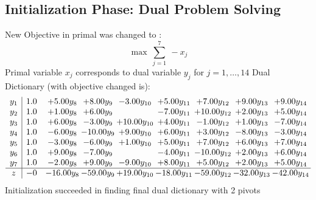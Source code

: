 \documentclass[8pt]{article}
\begin{document}
\subsection{Initialization Phase: Dual Problem Solving}
New Objective in primal was changed to : \[ \max\ \sum_{j=1}^{7}\ - x_j \] 
Primal variable $x_j$ corresponds to dual variable $y_j$ for $j = 1,\ldots,14$
Dual Dictionary (with objective changed is): 
\[\begin{array}{c| c c@{\hskip 2pt} c@{\hskip 2pt} c@{\hskip 2pt} c@{\hskip 2pt} c@{\hskip 2pt} c@{\hskip 2pt} c@{\hskip 2pt} }
 y_{1}   &  1.0 & +  5.00 y_{8} & +  8.00 y_{9} & -3.00 y_{10} & +  5.00 y_{11} & +  7.00 y_{12} & +  9.00 y_{13} & +  9.00 y_{14}\\
 y_{2}   &  1.0 & +  1.00 y_{8} & +  6.00 y_{9} &   & -7.00 y_{11} & + 10.00 y_{12} & +  2.00 y_{13} & +  5.00 y_{14}\\
 y_{3}   &  1.0 & +  6.00 y_{8} & -3.00 y_{9} & + 10.00 y_{10} & +  4.00 y_{11} & -1.00 y_{12} & +  1.00 y_{13} & -7.00 y_{14}\\
 y_{4}   &  1.0 & -6.00 y_{8} & -10.00 y_{9} & +  9.00 y_{10} & +  6.00 y_{11} & +  3.00 y_{12} & -8.00 y_{13} & -3.00 y_{14}\\
 y_{5}   &  1.0 & -3.00 y_{8} & -6.00 y_{9} & +  1.00 y_{10} & +  5.00 y_{11} & +  7.00 y_{12} & +  6.00 y_{13} & +  7.00 y_{14}\\
 y_{6}   &  1.0 & +  9.00 y_{8} & -7.00 y_{9} &   & -4.00 y_{11} & -10.00 y_{12} & +  2.00 y_{13} & +  6.00 y_{14}\\
 y_{7}   &  1.0 & -2.00 y_{8} & +  9.00 y_{9} & -9.00 y_{10} & +  8.00 y_{11} & +  5.00 y_{12} & +  2.00 y_{13} & +  5.00 y_{14}\\
\hline
z    &  -0 & -16.00 y_{8} & -59.00 y_{9} & + 19.00 y_{10} & -18.00 y_{11} & -59.00 y_{12} & -32.00 y_{13} & -42.00 y_{14}\\
\end{array}\]
Initialization succeeded in finding final dual dictionary with 2 pivots
\end{document}
